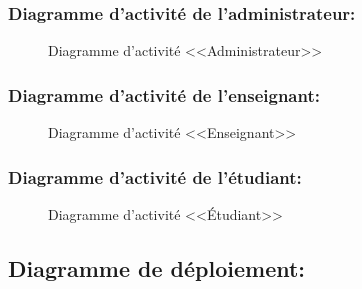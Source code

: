 \documentclass[12pt]{report}
\begin{document}
\newpage

\subsubsection{Diagramme d'activité de l'administrateur:}

\vspace{0.3in}

\begin{figure}[h]
\centering
    \caption{Diagramme d'activité <<Administrateur>>}
\end{figure}

\newpage

\subsubsection{Diagramme d'activité de l'enseignant:}

\vspace{0.3in}

\begin{figure}[h]
\centering
    \caption{Diagramme d'activité <<Enseignant>>}
\end{figure}

\newpage

\subsubsection{Diagramme d'activité de l'étudiant:}

\vspace{0.3in}

\begin{figure}[h]
\centering
    \caption{Diagramme d'activité <<Étudiant>>}
\end{figure}

\newpage

\subsection{Diagramme de déploiement:}
\end{document}
